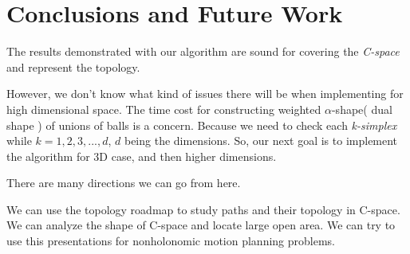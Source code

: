 \documentclass[11pt]{article}
\begin{document}
\section{Conclusions and Future Work}\label{conclusions}
\indent\indent The results demonstrated with our algorithm are sound for covering the \emph{C-space} and represent the topology.  

\indent However, we don't know what kind of issues there will be when implementing for high dimensional space. The time cost for constructing weighted $\alpha$-shape( dual shape ) of unions of balls is a concern. Because we need to check each \emph{k-simplex} while $k = 1, 2, 3, ..., d$, $d$ being the dimensions. So, our next goal is to implement the algorithm for 3D case, and then higher dimensions.

\indent There are many directions we can go from here.

\indent We can use the topology roadmap to study paths and their topology in C-space. We can analyze the shape of C-space and locate large open area. We can try to use this presentations for nonholonomic motion planning problems. 
\end{document}
